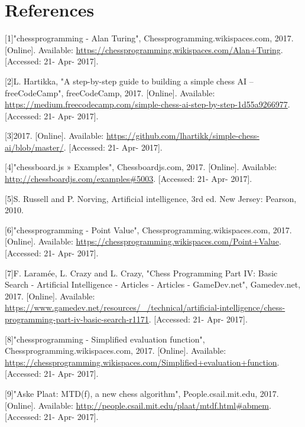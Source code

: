 \documentclass[11pt]{article}
\begin{document}
\section*{References}
\label{sec:org7ea1143}
[1]"chessprogramming - Alan Turing", Chessprogramming.wikispaces.com, 2017. [Online]. Available: \url{https://chessprogramming.wikispaces.com/Alan+Turing}. [Accessed: 21- Apr- 2017].

[2]L. Hartikka, "A step-by-step guide to building a simple chess AI – freeCodeCamp", freeCodeCamp, 2017. [Online]. Available: \url{https://medium.freecodecamp.com/simple-chess-ai-step-by-step-1d55a9266977}. [Accessed: 21- Apr- 2017].

[3]2017. [Online]. Available: \url{https://github.com/lhartikk/simple-chess-ai/blob/master/}. [Accessed: 21- Apr- 2017].

[4]"chessboard.js » Examples", Chessboardjs.com, 2017. [Online]. Available: \url{http://chessboardjs.com/examples\#5003}. [Accessed: 21- Apr- 2017].

[5]S. Russell and P. Norving, Artificial intelligence, 3rd ed. New Jersey: Pearson, 2010.

[6]"chessprogramming - Point Value", Chessprogramming.wikispaces.com, 2017. [Online]. Available: \url{https://chessprogramming.wikispaces.com/Point+Value}. [Accessed: 21- Apr- 2017].

[7]F. Laramée, L. Crazy and L. Crazy, "Chess Programming Part IV: Basic Search - Artificial Intelligence - Articles - Articles - GameDev.net", Gamedev.net, 2017. [Online]. Available: \url{https://www.gamedev.net/resources/\_/technical/artificial-intelligence/chess-programming-part-iv-basic-search-r1171}. [Accessed: 21- Apr- 2017].

[8]"chessprogramming - Simplified evaluation function", Chessprogramming.wikispaces.com, 2017. [Online]. Available: \url{https://chessprogramming.wikispaces.com/Simplified+evaluation+function}. [Accessed: 21- Apr- 2017].

[9]"Aske Plaat: MTD(f), a new chess algorithm", People.csail.mit.edu, 2017. [Online]. Available: \url{http://people.csail.mit.edu/plaat/mtdf.html\#abmem}. [Accessed: 21- Apr- 2017].
\end{document}
